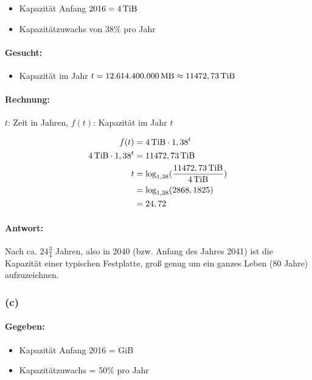 \documentclass[11pt,a4paper]{article}
\begin{document}
\begin{itemize}
    \item Kapazität Anfang $2016 = \unit[4]{TiB}$
    \item Kapazitätzuwachs von $38\%$ pro Jahr
\end{itemize}

\paragraph{Gesucht:}

\begin{itemize}
    \item Kapazität im Jahr $t = \unit[12.614.400.000]{MB} \approx \unit[11472,73]{TiB}$
\end{itemize}

\paragraph{Rechnung:}

    $t$: Zeit in Jahren, $f(t)$: Kapazität im Jahr $t$

\begin{align}
    f(t) &= \unit[4]{TiB}\cdot1,38^{t}\\
    \unit[4]{TiB} \cdot 1,38^{t} &= \unit[11472,73]{TiB}\\
    t &= \log_{1,38}(\frac{\unit[11472,73]{TiB}}{\unit[4]{TiB}})\\
      &= \log_{1,38}(2868,1825)\\
      &= 24,72
\end{align}

\paragraph{Antwort:}
Nach ca. $24\frac{3}{4}$ Jahren, also in 2040 (bzw. Anfang des Jahres 2041) ist die Kapazität einer typischen Festplatte, groß genug um ein ganzes Leben (80 Jahre) aufzuzeichnen.


\subsubsection{(c)} %

\paragraph{Gegeben:}
\begin{itemize}
    \item Kapazität Anfang 2016 = \unit[128]{GiB}\\
    \item Kapazitätzuwachs = 50\% pro Jahr
\end{itemize}
\end{document}

